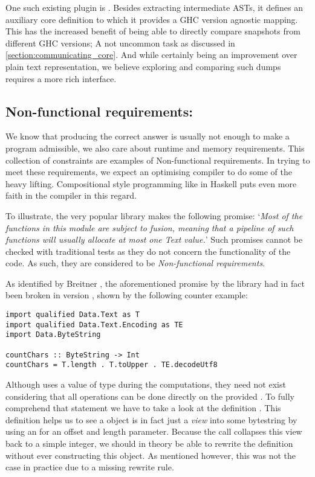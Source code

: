 One such existing plugin is  \cite{ghc_dump}. Besides extracting intermediate ASTs, it defines an
auxiliary core definition to which it provides a GHC version agnostic mapping. This has the increased benefit of 
being able to directly compare snapshots from different GHC versions; A not uncommon task as discussed in \cref{section:communicating_core}.
And while certainly being an improvement over plain text representation, we believe exploring and comparing such
dumps requires a more rich interface.

\subsection{Non-functional requirements: }
\label{section:background_inspection_testing}

We know that producing the correct answer is usually not enough to make a program admissible,
we also care about runtime and memory requirements. This collection of constraints are examples of 
Non-functional requirements. In trying to meet these requirements, we expect an optimising compiler
to do some of the heavy lifting. Compositional style programming like in Haskell puts even more
faith in the compiler in this regard.

To illustrate, the very popular  library makes the following promise: `\textit{Most of the functions in this module are subject to
fusion, meaning that a pipeline of such functions will usually allocate at most one Text value.}' \cite{inspection_testing}
Such promises cannot be checked with traditional tests as they do not concern the functionality of the code. As such,
they are considered to be \textit{Non-functional requirements}.

As identified by Breitner \cite{inspection_testing}, the aforementioned promise by the  library had in fact
been broken in version , shown by the following counter example:

\begin{verbatim}
import qualified Data.Text as T
import qualified Data.Text.Encoding as TE
import Data.ByteString

countChars :: ByteString -> Int
countChars = T.length . T.toUpper . TE.decodeUtf8
\end{verbatim}

Although  uses a value of type  during the computations, they need not exist
considering that all operations can be done directly on the provided . To fully comprehend
that statement we have to take a look at the definition . This definition
helps us to see a  object is in fact just a \textit{view} into some bytestring by using an  for
an offset and length parameter. Because the call  collapses this view back to a simple integer, we
should in theory be able to rewrite the definition without ever constructing this  object.
As mentioned however, this was not the case in practice due to a missing rewrite rule.

